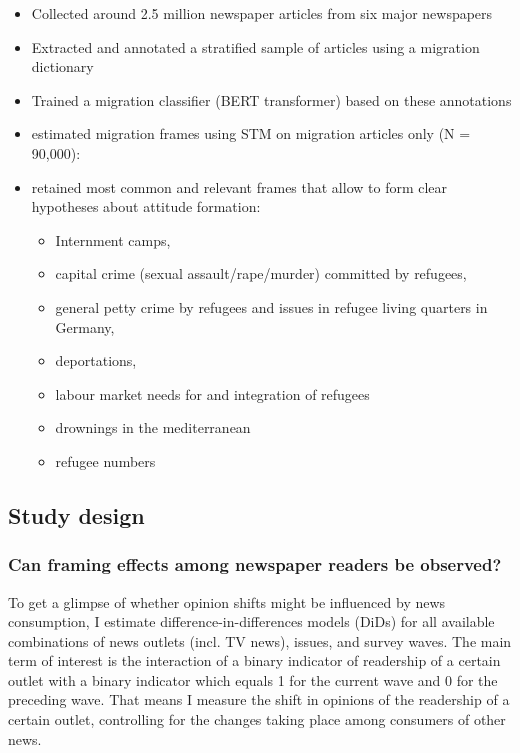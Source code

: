 \documentclass{article}
\begin{document}
\begin{itemize}
    \item Collected around 2.5 million newspaper articles from six major newspapers
    \item Extracted and annotated a stratified sample of articles using a migration dictionary
    \item Trained a migration classifier (BERT transformer) based on these annotations
    \item estimated migration frames using STM on migration articles only (N = 90,000): 
    \item retained most common and relevant frames that allow to form clear hypotheses about attitude formation:
    \begin{itemize}
        \item Internment camps, 
        \item capital crime (sexual assault/rape/murder) committed by refugees, 
        \item general petty crime by refugees and issues in refugee living quarters in Germany,
        \item deportations,
        \item labour market needs for and integration of refugees
        \item drownings in the mediterranean
        \item refugee numbers
    \end{itemize}
\end{itemize}



\subsection{Study design}

\subsubsection{Can framing effects among newspaper readers be observed?}

To get a glimpse of whether opinion shifts might be influenced by news consumption, I estimate difference-in-differences models (DiDs) for all available combinations of news outlets (incl. TV news), issues, and survey waves. The main term of interest is the interaction of a binary indicator of readership of a certain outlet with a binary indicator which equals 1 for the current wave and 0 for the preceding wave. That means I measure the shift in opinions of the readership of a certain outlet, controlling for the changes taking place among consumers of other news.
\end{document}
